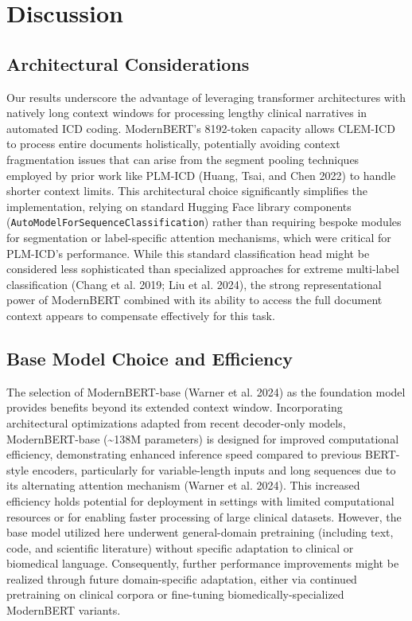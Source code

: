 \documentclass[
]{article}
\begin{document}
\section{Discussion}\label{discussion}

\subsection{Architectural
Considerations}\label{architectural-considerations}

Our results underscore the advantage of leveraging transformer
architectures with natively long context windows for processing lengthy
clinical narratives in automated ICD coding. ModernBERT's 8192-token
capacity allows CLEM-ICD to process entire documents holistically,
potentially avoiding context fragmentation issues that can arise from
the segment pooling techniques employed by prior work like PLM-ICD
(Huang, Tsai, and Chen 2022) to handle shorter context limits. This
architectural choice significantly simplifies the implementation,
relying on standard Hugging Face library components
(\texttt{AutoModelForSequenceClassification}) rather than requiring
bespoke modules for segmentation or label-specific attention mechanisms,
which were critical for PLM-ICD's performance. While this standard
classification head might be considered less sophisticated than
specialized approaches for extreme multi-label classification (Chang et
al. 2019; Liu et al. 2024), the strong representational power of
ModernBERT combined with its ability to access the full document context
appears to compensate effectively for this task.

\subsection{Base Model Choice and
Efficiency}\label{base-model-choice-and-efficiency}

The selection of ModernBERT-base (Warner et al. 2024) as the foundation
model provides benefits beyond its extended context window.
Incorporating architectural optimizations adapted from recent
decoder-only models, ModernBERT-base (\textasciitilde138M parameters) is
designed for improved computational efficiency, demonstrating enhanced
inference speed compared to previous BERT-style encoders, particularly
for variable-length inputs and long sequences due to its alternating
attention mechanism (Warner et al. 2024). This increased efficiency
holds potential for deployment in settings with limited computational
resources or for enabling faster processing of large clinical datasets.
However, the base model utilized here underwent general-domain
pretraining (including text, code, and scientific literature) without
specific adaptation to clinical or biomedical language. Consequently,
further performance improvements might be realized through future
domain-specific adaptation, either via continued pretraining on clinical
corpora or fine-tuning biomedically-specialized ModernBERT variants.
\end{document}
